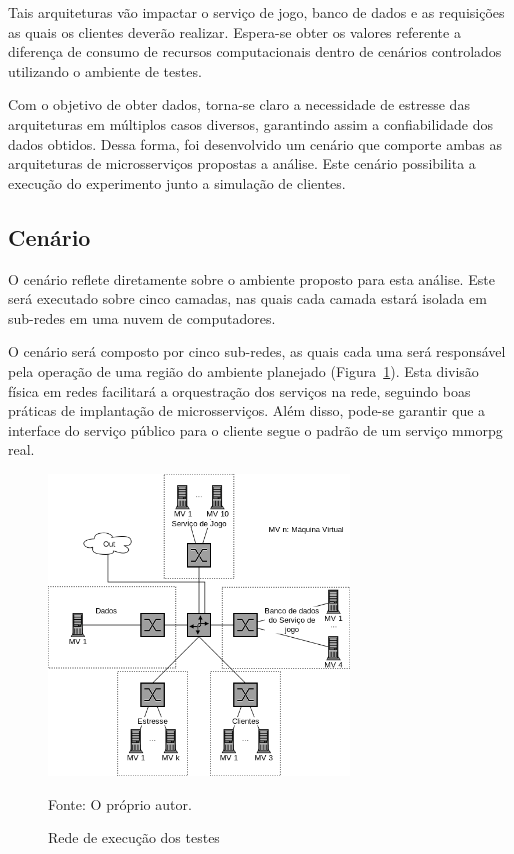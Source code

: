 Tais arquiteturas vão impactar o serviço de jogo, banco de dados e as requisições as quais os clientes deverão realizar.
%
Espera-se obter os valores referente a diferença de consumo de recursos computacionais dentro de cenários controlados utilizando o ambiente de testes.



Com o objetivo de obter dados, torna-se claro a necessidade de estresse das arquiteturas em múltiplos casos diversos, garantindo assim a confiabilidade dos dados obtidos.
%
Dessa forma, foi desenvolvido um cenário que comporte ambas as arquiteturas de microsserviços propostas a análise.
%
Este cenário possibilita a execução do experimento junto a simulação de clientes.



\subsection{Cenário}



O cenário reflete diretamente sobre o ambiente proposto para esta análise.
%
Este será executado sobre cinco camadas, nas quais cada camada estará isolada em sub-redes em uma nuvem de computadores.

O cenário será composto por cinco sub-redes, as quais cada uma será responsável pela operação de uma região do ambiente planejado (Figura~\ref{fig:cenario}).
%
Esta divisão física em redes facilitará a orquestração dos serviços na rede, seguindo boas práticas de implantação de microsserviços.
%
Além disso, pode-se garantir que a interface do serviço público para o cliente segue o padrão de um serviço \ac{mmorpg} real.

\begin{figure}[htb!]
  \caption{Rede de execução dos testes}
  \label{fig:cenario}
  \includegraphics[height=8cm]{img/cap3/cenario.png}
  \centering

  Fonte: O próprio autor.
\end{figure}

